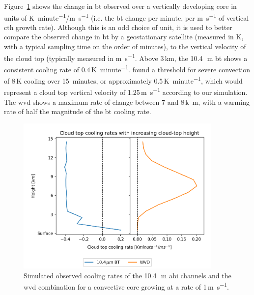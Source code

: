 Figure~\ref{fig:cloud_height_cooling_rates} shows the change in \acrshort{bt} observed over a vertically developing core in units of \unit{K minute^{-1}/m s^{-1}} (i.e. the \acrshort{bt} change per minute, per \unit{m s^{-1}} of vertical \acrshort{cth} growth rate).
Although this is an odd choice of unit, it is used to better compare the observed change in \acrshort{bt} by a geostationary satellite (measured in \unit{K}, with a typical sampling time on the order of minutes), to the vertical velocity of the cloud top (typically measured in \unit{m s^{-1}}.
Above 3\,\unit{km}, the 10.4\,\unit{\mu m} \acrshort{bt} shows a consistent cooling rate of 0.4\,\unit{K minute^{-1}}.
\citet{roberts_nowcasting_2003} found a threshold for severe convection of 8\,\unit{K} cooling over 15~minutes, or approximately 0.5\,\unit{K minute^{-1}}, which would represent a cloud top vertical velocity of 1.25\,\unit{m s^{-1}} according to our simulation.
The \acrshort{wvd} shows a maximum rate of change between 7 and 8\,\unit{k m}, with a warming rate of half the magnitude of the \acrshort{bt} cooling rate.


\begin{figure}[tp]
    \includegraphics[width=0.9\textwidth]{figures/chapter1_07.png}
    \caption[
    Simulated observed cooling rates of the 10.4\,\unit{\mu m} \acrshort{abi} channels and the \acrshort{wvd} combination for a convective core growing at a rate of 1\,\unit{m s^{-1}}
    ]{
    Simulated observed cooling rates of the 10.4\,\unit{\mu m} \acrshort{abi} channels and the \acrshort{wvd} combination for a convective core growing at a rate of 1\,\unit{m s^{-1}}.
    }
    \label{fig:cloud_height_cooling_rates}
\end{figure}


